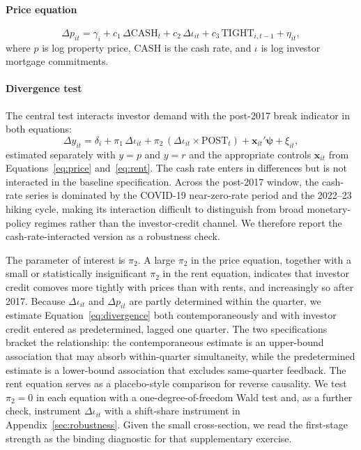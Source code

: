 \documentclass[preprint,11pt,authoryear]{elsarticle}
\begin{document}
\paragraph{Price equation}

\begin{equation}
\label{eq:price}
\Delta p_{it} = \gamma_i + c_1\,\Delta \text{CASH}_t
 + c_2\,\Delta \iota_{it} + c_3\,\text{TIGHT}_{i,t-1}
 + \eta_{it},
\end{equation}
where $p$ is log property price, $\text{CASH}$ is the cash rate, and
$\iota$ is log investor mortgage commitments.

\paragraph{Divergence test}

The central test interacts investor demand with the post-2017 break
indicator in both equations:
\begin{equation}
\label{eq:divergence}
\Delta y_{it} = \delta_i + \pi_1\,\Delta \iota_{it}
 + \pi_2\,(\Delta \iota_{it}\!\times\!\text{POST}_t)
 + \mathbf{x}_{it}'\boldsymbol{\psi} + \xi_{it},
\end{equation}
estimated separately with $y=p$ and $y=r$ and the appropriate controls
$\mathbf{x}_{it}$ from Equations~\ref{eq:price} and~\ref{eq:rent}. The
cash rate enters in differences but is not interacted in the baseline
specification. Across the post-2017 window, the cash-rate series is
dominated by the COVID-19 near-zero-rate period and the 2022--23 hiking
cycle, making its interaction difficult to distinguish from broad
monetary-policy regimes rather than the investor-credit channel. We
therefore report the cash-rate-interacted version as a robustness check.

The parameter of interest is $\pi_2$. A large $\pi_2$ in the price
equation, together with a small or statistically insignificant $\pi_2$ in
the rent equation, indicates that investor credit comoves more tightly
with prices than with rents, and increasingly so after 2017. Because
$\Delta\iota_{it}$ and $\Delta p_{it}$ are partly determined within the
quarter, we estimate Equation~\ref{eq:divergence} both contemporaneously
and with investor credit entered as predetermined, lagged one quarter.
The two specifications bracket the relationship: the contemporaneous
estimate is an upper-bound association that may absorb within-quarter
simultaneity, while the predetermined estimate is a lower-bound
association that excludes same-quarter feedback. The rent equation serves
as a placebo-style comparison for reverse causality. We test
$\pi_2=0$ in each equation with a one-degree-of-freedom Wald test and,
as a further check, instrument $\Delta\iota_{it}$ with a shift-share
instrument in Appendix~\ref{sec:robustness}. Given the small
cross-section, we read the first-stage strength as the binding diagnostic
for that supplementary exercise.
\end{document}

